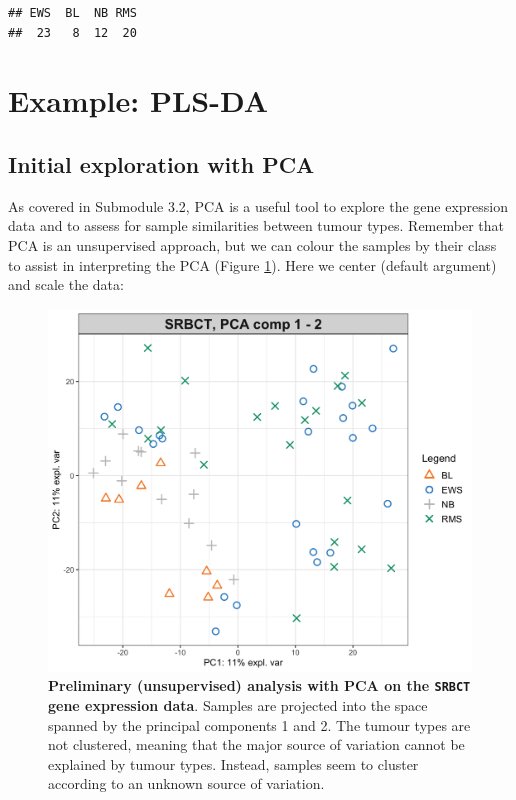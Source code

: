 \documentclass[]{book}
\newenvironment{Shaded}{\begin{snugshade}}{\end{snugshade}}
\newcommand{\DataTypeTok}[1]{\textcolor[rgb]{0.13,0.29,0.53}{#1}}
\newcommand{\DecValTok}[1]{\textcolor[rgb]{0.00,0.00,0.81}{#1}}
\newcommand{\KeywordTok}[1]{\textcolor[rgb]{0.13,0.29,0.53}{\textbf{#1}}}
\newcommand{\NormalTok}[1]{#1}
\newcommand{\OperatorTok}[1]{\textcolor[rgb]{0.81,0.36,0.00}{\textbf{#1}}}
\newcommand{\OtherTok}[1]{\textcolor[rgb]{0.56,0.35,0.01}{#1}}
\newcommand{\StringTok}[1]{\textcolor[rgb]{0.31,0.60,0.02}{#1}}
\begin{document}
\begin{verbatim}
## EWS  BL  NB RMS 
##  23   8  12  20
\end{verbatim}

\hypertarget{ex:plsda}{%
\section{Example: PLS-DA}\label{ex:plsda}}

\hypertarget{initial-exploration-with-pca}{%
\subsection{Initial exploration with PCA}\label{initial-exploration-with-pca}}

As covered in Submodule 3.2, PCA is a useful tool to explore the gene expression data and to assess for sample similarities between tumour types. Remember that PCA is an unsupervised approach, but we can colour the samples by their class to assist in interpreting the PCA (Figure \ref{fig:plsda-pca}). Here we center (default argument) and scale the data:

\begin{Shaded}
\end{Shaded}

\begin{figure}

{\centering \includegraphics[width=0.5\linewidth]{Figures/PLSDA/plsda-pca-1} 

}

\caption{\textbf{Preliminary (unsupervised) analysis with PCA on the \texttt{SRBCT} gene expression data}. Samples are projected into the space spanned by the principal components 1 and 2. The tumour types are not clustered, meaning that the major source of variation cannot be explained by tumour types. Instead, samples seem to cluster according to an unknown source of variation.}\label{fig:plsda-pca}
\end{figure}
\end{document}
